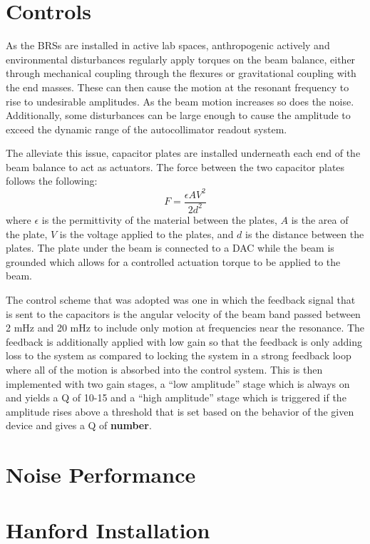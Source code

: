 \documentclass [12pt, proquest]{uwthesis}[2019]
\begin{document}
\section{Controls}

\quad As the BRSs are installed in active lab spaces, anthropogenic actively and environmental disturbances regularly apply torques on the beam balance, either through mechanical coupling through the flexures or gravitational coupling with the end masses. These can then cause the motion at the resonant frequency to rise to undesirable amplitudes. As the beam motion increases so does the noise. Additionally, some disturbances can be large enough to cause the amplitude to exceed the dynamic range of the autocollimator readout system.

The alleviate this issue, capacitor plates are installed underneath each end of the beam balance to act as actuators. The force between the two capacitor plates follows the following: 
\[F=\frac{\epsilon A V^2}{2d^2}\]
where $\epsilon$ is the permittivity of the material between the plates, $A$ is the area of the plate, $V$ is the voltage applied to the plates, and $d$ is the distance between the plates. The plate under the beam is connected to a DAC while the beam is grounded which allows for a controlled actuation torque to be applied to the beam. 

The control scheme that was adopted was one in which the feedback signal that is sent to the capacitors is the angular velocity of the beam band passed between 2 mHz and 20 mHz to include only motion at frequencies near the resonance. The feedback is additionally applied with low gain so that the feedback is only adding loss to the system as compared to locking the system in a strong feedback loop where all of the motion is absorbed into the control system. This is then implemented with two gain stages, a ``low amplitude'' stage which is always on and yields a Q of 10-15 and a ``high amplitude'' stage which is triggered if the amplitude rises above a threshold that is set based on the behavior of the given device and gives a Q of \textbf{number}.

\section{Noise Performance}
\section{Hanford Installation} \label{BRS_Hanford}
\end{document}
